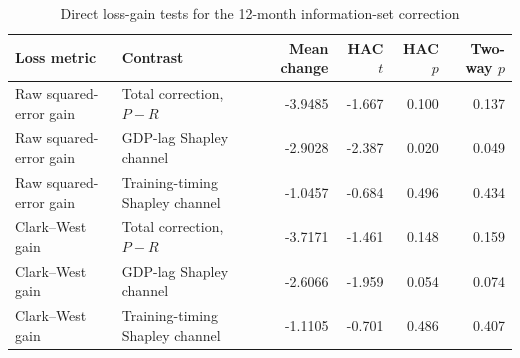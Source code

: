 \begin{table}[htbp]
\centering\scriptsize
\caption{Direct loss-gain tests for the 12-month information-set correction}
\label{stab:channel_loss_tests}
\begin{tabular}{llrrrr}
\toprule
Loss metric & Contrast & Mean change & HAC $t$ & HAC $p$ & Two-way $p$ \\
\midrule
Raw squared-error gain & Total correction, $P-R$ & -3.9485 & -1.667 & 0.100 & 0.137 \\
Raw squared-error gain & GDP-lag Shapley channel & -2.9028 & -2.387 & 0.020 & 0.049 \\
Raw squared-error gain & Training-timing Shapley channel & -1.0457 & -0.684 & 0.496 & 0.434 \\
Clark--West gain & Total correction, $P-R$ & -3.7171 & -1.461 & 0.148 & 0.159 \\
Clark--West gain & GDP-lag Shapley channel & -2.6066 & -1.959 & 0.054 & 0.074 \\
Clark--West gain & Training-timing Shapley channel & -1.1105 & -0.701 & 0.486 & 0.407 \\
\bottomrule
\end{tabular}
\end{table}

